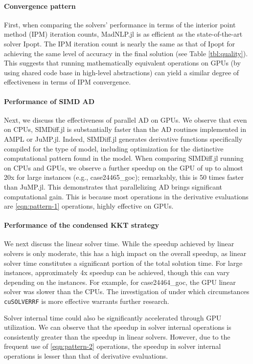 \paragraph{Convergence pattern}
First, when comparing the solvers' performance in terms of the
interior point method (IPM) iteration counts, MadNLP.jl is as
efficient as the state-of-the-art solver Ipopt. The IPM iteration
count is nearly the same as that of Ipopt for achieving the same level
of accuracy in the final solution (see Table \ref{tbl:quality}). This
suggests that running mathematically equivalent operations on GPUs (by
using shared code base in high-level abstractions) can yield a similar
degree of effectiveness in terms of IPM convergence.

\paragraph{Performance of SIMD AD}
Next, we discuss the effectiveness of parallel AD on GPUs. We observe
that even on CPUs, SIMDiff.jl is substantially faster than the AD
routines implemented in AMPL or JuMP.jl. Indeed,
SIMDiff.jl generates derivative functions specifically compiled
for the type of model, including optimization for the distinctive
computational pattern found in the model. When comparing SIMDiff.jl running
on CPUs and GPUs, we observe a further speedup on the GPU of up to almost 20x for
large instances (e.g., case24465\_goc); remarkably, this is 50 times
faster than JuMP.jl. This demonstrates that parallelizing AD
brings significant computational gain.
This is because most operations in the derivative
evaluations are \ref{eqn:pattern-1}
operations, highly effective on GPUs.

\paragraph{Performance of the condensed KKT strategy}
We next discuss the linear solver time. While the speedup achieved by
linear solvers is only moderate, this has a high impact on the overall
speedup, as linear solver time constitutes a significant portion of
the total solution time. For large instances, approximately 4x speedup
can be achieved, though this can vary depending on the instances. For
example, for case24464\_goc, the GPU linear solver was slower than the
CPUs. The investigation of under which circumstances {\tt cuSOLVERRF} is
more effective warrants further research.

Solver internal time could also be significantly accelerated through
GPU utilization. We can observe that the speedup in solver internal
operations is consistently greater than the speedup in linear
solvers. However, due to the frequent use of \ref{eqn:pattern-2}
operations, the speedup in solver internal operations is lesser than
that of derivative evaluations.

